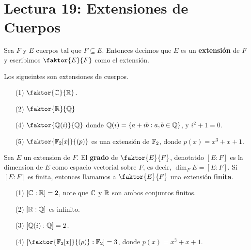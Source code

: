 \section*{Lectura 19: Extensiones de Cuerpos}

\begin{definition}
    Sea $F$ y  $E$ cuerpos tal que  $F \subseteq E$. Entonces decimos que  $E$
    es un  \textbf{extensi\'on} de $F$ y escribimos $\faktor{E}{F}$ como el
    extensi\'on.
\end{definition}

\begin{example}\label{}
    Los sigueintes son extensiones de cuerpos.
    \begin{enumerate}
        \item[(1)] $\faktor{\C}{\R}$.

        \item[(2)] $\faktor{\R}{\Q}$

        \item[(4)] $\faktor{\Q(i)}{\Q}$ donde $\mathbb{Q}(i)=\{a+ib : a,b \in \mathbb{Q}\}$, y
            $i^2+1=0$.

        \item[(5)] $\faktor{\F_2[x]}{(p)}$ es una extensi\'on de $\mathbb{F}_2$, donde
            $p(x)=x^3+x+1$.
    \end{enumerate}
\end{example}

\begin{definition}
    Sea $E$ un extension de  $F$. El  \textbf{grado} de $\faktor{E}{F}$,
    denotatdo $[E:F]$ es la dimension de  $E$ como espacio vectorial sobre  $F$,
    es decir, $\dim_F{E}=[E:F]$. S\'i $[E:F]$ es finita, entonces llamamos a
    $\faktor{E}{F}$ una extensi\'on \textbf{finita}.
\end{definition}

\begin{example}\label{}
    \begin{enumerate}
        \item[(1)] $[\mathbb{C}:\mathbb{R}]=2$, note que $\mathbb{C}$ y  $\mathbb{R}$ son ambos conjuntos finitos.

        \item[(2)] $[\mathbb{R}:\mathbb{Q}]$ es infinito.

        \item[(3)] $[\mathbb{Q}(i):\mathbb{Q}]=2$.

        \item[(4)] $[\faktor{\F_2[x]}{(p)}:\F_2]=3$, donde $p(x)=x^3+x+1$.
    \end{enumerate}
\end{example}

